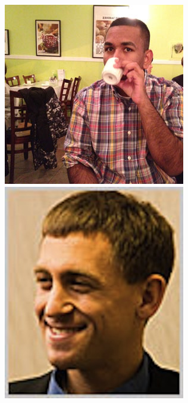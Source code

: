 \documentclass[xcolor=dvipsnames,red]{beamer}
\begin{document}
\begin{frame}
\begin{columns}
\begin{column}{.25\textwidth}
\includegraphics[width=.75\textwidth]{imgs/jearvon_dharrie.jpg}\\
\vspace{.2 cm}
\includegraphics[width=.75\textwidth]{imgs/dimarco.jpg}\\
\vspace{.2 cm}

\end{column}
\end{columns}
\end{frame}
\end{document}
